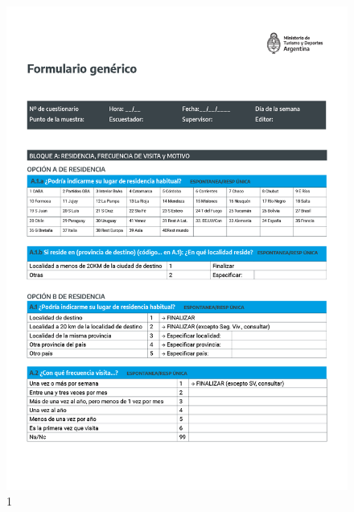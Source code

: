 \documentclass[
]{book}
\begin{document}
\begin{figure}
\includegraphics[width=17.22in]{imagenes/graf01} \caption{1}\label{fig:001}
\end{figure}
\end{document}
